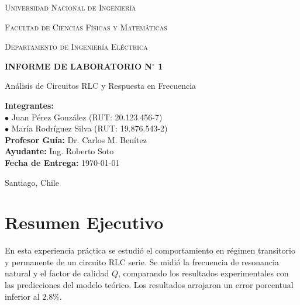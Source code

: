 \documentclass[11pt, letterpaper]{article}
\begin{document}
\begin{titlepage}
  \centering
  {\scshape\LARGE Universidad Nacional de Ingeniería \par}
  \vspace{0.5cm}
  {\scshape\Large Facultad de Ciencias Físicas y Matemáticas \par}
  {\scshape\large Departamento de Ingeniería Eléctrica \par}
  \vspace{3cm}

  \begin{tcolorbox}[colback=darkslate, colframe=natexorange, arc=3mm, boxrule=2pt]
    \centering
    \vspace{0.3cm}
    {\Huge \bfseries \color{white} INFORME DE LABORATORIO N$^\circ$ 1 \par}
    \vspace{0.4cm}
    {\Large \color{natexorange} Análisis de Circuitos RLC y Respuesta en Frecuencia \par}
    \vspace{0.3cm}
  \end{tcolorbox}

  \vspace{3cm}

  \begin{flushleft}
    \large
    \textbf{Integrantes:} \\
    $\bullet$ Juan Pérez González (RUT: 20.123.456-7) \\
    $\bullet$ María Rodríguez Silva (RUT: 19.876.543-2) \\[0.4cm]
    \textbf{Profesor Guía:} Dr. Carlos M. Benítez \\
    \textbf{Ayudante:} Ing. Roberto Soto \\
    \textbf{Fecha de Entrega:} \today
  \end{flushleft}

  \vfill
  {\large Santiago, Chile \par}
\end{titlepage}

\tableofcontents
\newpage

\section{Resumen Ejecutivo}
En esta experiencia práctica se estudió el comportamiento en régimen transitorio y permanente de un circuito RLC serie. Se midió la frecuencia de resonancia natural y el factor de calidad $Q$, comparando los resultados experimentales con las predicciones del modelo teórico. Los resultados arrojaron un error porcentual inferior al $2.8\%$.
\end{document}
